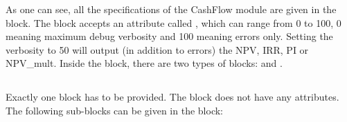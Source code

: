 As one can see, all the specifications of the CashFlow module are given in the  block. The block accepts an attribute called , 
which can range from 0 to 100, 0 meaning maximum debug verbosity and 100 meaning errors only. Setting the verbosity to 50 will output (in addition to errors) the NPV, IRR, PI or NPV\_mult. Inside the  block, there are two types of blocks:  and .

\subsection{}
Exactly one  block has to be provided. The  block does not have any attributes. The following sub-blocks can be given in the  block:

